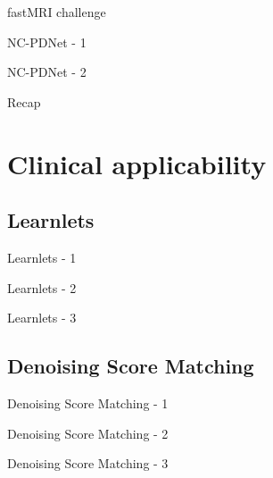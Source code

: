 \documentclass[aspectratio=169,xcolor=dvipsnames]{beamer}
\begin{document}
\begin{frame}{fastMRI challenge}
\end{frame}

\begin{frame}{NC-PDNet - 1}
\end{frame}

\begin{frame}{NC-PDNet - 2}
\end{frame}

\begin{frame}{Recap}
\end{frame}

\section{Clinical applicability}
\subsection{Learnlets}
\begin{frame}{Learnlets - 1}
\end{frame}

\begin{frame}{Learnlets - 2}
\end{frame}

\begin{frame}{Learnlets - 3}
\end{frame}

\subsection{Denoising Score Matching}
\begin{frame}{Denoising Score Matching - 1}
\end{frame}

\begin{frame}{Denoising Score Matching - 2}
\end{frame}

\begin{frame}{Denoising Score Matching - 3}
\end{frame}
\end{document}
